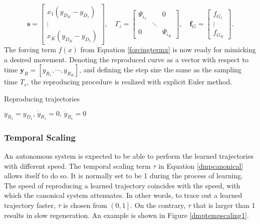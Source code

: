 \begin{equation*}
\bm{s}= \begin{bmatrix}
x_1\left(y_{D_K}-y_{D_1}\right)\\\vdots\\x_K\left(y_{D_K}-y_{D_1}\right)
\end{bmatrix},\quad
\Gamma_i=\begin{bmatrix}
\Psi_{i_1}&&0\\&\ddots&\\0&&\Psi_{i_K}
\end{bmatrix},\quad
\bm{f}_G=\begin{bmatrix}
f_{G_1}\\\vdots\\f_{G_K}
\end{bmatrix}.
\end{equation*}
The forcing term $ f(x) $ from Equation {\ref{forcingtermx}} is now ready for mimicking a desired movement. Denoting the reproduced curve as a vector with respect to time $ \bm{y}_{R} = \left[y_{R_1},\cdots,y_{R_K}\right] $, and defining the step size the same as the sampling time $ T_s $, the reproducing procedure is realized with explicit Euler method. 

\begin{algorithm}[H]  
	
	\caption{Reproducing trajectories}
	\begin{algorithmic}[1]
		\STATE {} $ y_{R_1}=y_{D_1},\,\dot{y}_{R_1}=0,\,\ddot{y}_{R_1}=0 $
		\STATE {}
		\STATE {}
		\STATE {}
		\ENDFOR
	\end{algorithmic} 
	\label{DMPreproduce} 
\end{algorithm}

\subsubsection{Temporal Scaling}
An autonomous system is expected to be able to perform the learned trajectories with different speed. The temporal scaling term $ \tau $ in Equation {\ref{dmpcanonical}} allows itself to do so. It is normally set to be 1 during the process of learning. The speed of reproducing a learned trajectory coincides with the speed, with which the canonical system attenuates. In other words, to trace out a learned trajectory faster, $ \tau $ is chosen from $ \left(0,1\right] $. On the contrary, $ \tau $ that is larger than 1 results in slow regeneration. An example is shown in Figure {\ref{dmptempscaling1}}.

